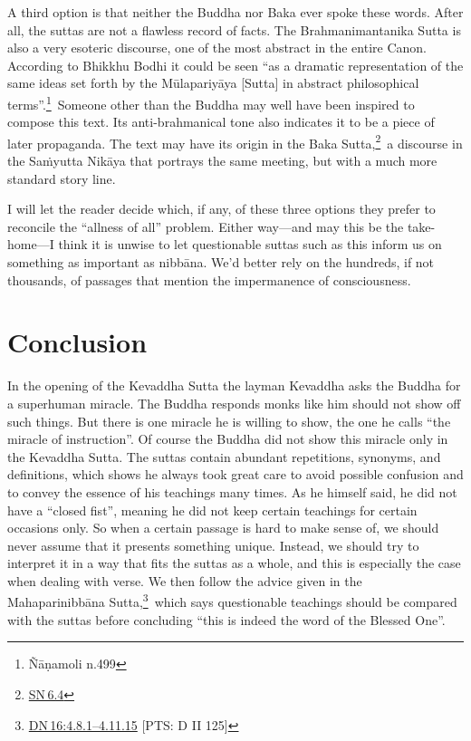 \documentclass[10pt, openright]{book}
\begin{document}
A third option is that neither the Buddha nor Baka ever spoke these words. After all, the suttas are not a flawless record of facts. The Brahmanimantanika Sutta is also a very esoteric discourse, one of the most abstract in the entire Canon. According to Bhikkhu Bodhi it could be seen “as a dramatic representation of the same ideas set forth by the Mūlapariyāya [Sutta] in abstract philosophical terms”.\footnote {Ñāṇamoli n.499} Someone other than the Buddha may well have been inspired to compose this text. Its anti-brahmanical tone also indicates it to be a piece of later propaganda. The text may have its origin in the Baka Sutta,\footnote {\href{https://suttacentral.net/sn6.4/en/sujato}{SN 6.4}} a discourse in the Saṁyutta Nikāya that portrays the same meeting, but with a much more standard story line.


I will let the reader decide which, if any, of these three options they prefer to reconcile the “allness of all” problem. Either way—and may this be the take-home—I think it is unwise to let questionable suttas such as this inform us on something as important as nibbāna. We’d better rely on the hundreds, if not thousands, of passages that mention the impermanence of consciousness.


\chapter{Conclusion}
In the opening of the Kevaddha Sutta the layman Kevaddha asks the Buddha for a superhuman miracle. The Buddha responds monks like him should not show off such things. But there is one miracle he is willing to show, the one he calls “the miracle of instruction”. Of course the Buddha did not show this miracle only in the Kevaddha Sutta. The suttas contain abundant repetitions, synonyms, and definitions, which shows he always took great care to avoid possible confusion and to convey the essence of his teachings many times. As he himself said, he did not have a “closed fist”, meaning he did not keep certain teachings for certain occasions only. So when a certain passage is hard to make sense of, we should never assume that it presents something unique. Instead, we should try to interpret it in a way that fits the suttas as a whole, and this is especially the case when dealing with verse. We then follow the advice given in the Mahaparinibbāna Sutta,\footnote {\href{https://suttacentral.net/dn16/en/sujato\#4.8.1}{DN 16:4.8.1–4.11.15} [PTS: D II 125]} which says questionable teachings should be compared with the suttas before concluding “this is indeed the word of the Blessed One”.
\end{document}
